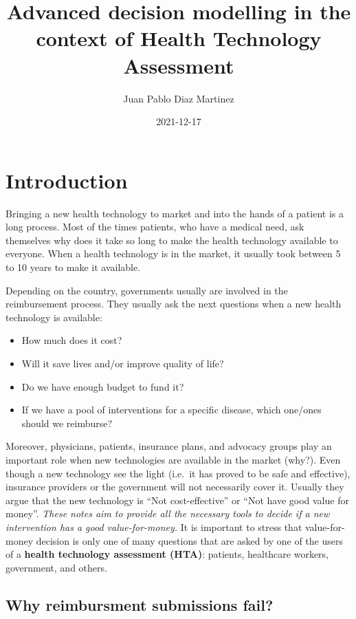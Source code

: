 \documentclass[
]{book}
\title{Advanced decision modelling in the context of Health Technology Assessment}
\author{Juan Pablo Diaz Martinez}
\date{2021-12-17}
\providecommand{\tightlist}{%
  \setlength{\itemsep}{0pt}\setlength{\parskip}{0pt}}
\begin{document}
\maketitle

{
\setcounter{tocdepth}{1}
\tableofcontents
}
\hypertarget{introduction}{%
\chapter*{Introduction}\label{introduction}}

Bringing a new health technology to market and into the hands of a patient is a long process. Most of the times patients, who have a medical need, ask themselves why does it take so long to make the health technology available to everyone. When a health technology is in the market, it usually took between 5 to 10 years to make
it available.

Depending on the country, governments usually are involved in the reimbursement process. They usually ask the next questions when a new health technology is available:

\begin{itemize}
\tightlist
\item
  How much does it cost?
\item
  Will it save lives and/or improve quality of life?
\item
  Do we have enough budget to fund it?
\item
  If we have a pool of interventions for a specific disease, which one/ones should we reimburse?
\end{itemize}

Moreover, physicians, patients, insurance plans, and advocacy groups play an important role when new technologies are available in the market (why?). Even though a new technology see the light (i.e.~it has proved to be safe and effective), insurance providers or the government will not necessarily cover it. Usually they argue that the new technology is ``Not cost-effective'' or ``Not have good value for money''. \emph{These notes aim to provide all the necessary tools to decide if a new intervention has a good value-for-money.} It is important to stress that value-for-money decision is only one of many questions that are asked by one of the users of a \textbf{health technology assessment (HTA)}: patients, healthcare workers, government, and others.

\hypertarget{why-reimbursment-submissions-fail}{%
\section*{Why reimbursment submissions fail?}\label{why-reimbursment-submissions-fail}}
\end{document}
